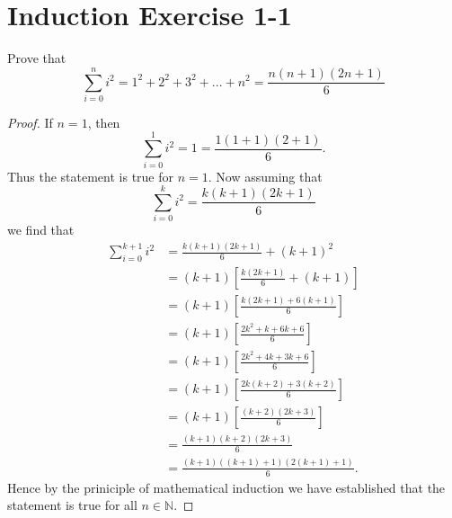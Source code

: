 \documentclass{article}
\begin{document}
\section*{Induction Exercise 1-1}
Prove that
\[
	\sum_{i=0}^{n} i^2 = 1^2 + 2^2 + 3^2 + ... + n^2 = \frac{n(n+1)(2n+1)}{6}
\]
\begin{proof}
	If $n=1$, then
	\[
		\sum_{i=0}^{1} i^2 = 1 = \frac{1(1+1)(2+1)}{6}.
	\]
	Thus the statement is true for $n=1$.
	\newline\newline
	Now assuming that
	\[
		\sum_{i=0}^{k} i^2 = \frac{k(k+1)(2k+1)}{6}
	\]
	we find that 
	\begin{align*}
		\sum_{i=0}^{k+1} i^2 & = \frac{k(k+1)(2k+1)}{6} + (k+1)^2 \\
				     & = (k+1) \left[ \frac{k(2k+1)}{6} + (k+1) \right] \\
				     & = (k+1) \left[ \frac{k(2k+1) + 6(k+1)}{6} \right] \\
				     & = (k+1) \left[ \frac{2k^2 + k + 6k + 6}{6} \right] \\
				     & = (k+1) \left[ \frac{2k^2 + 4k + 3k + 6}{6} \right] \\
				     & = (k+1) \left[ \frac{2k(k+2) + 3(k+2)}{6} \right] \\
				     & = (k+1) \left[ \frac{(k+2)(2k+3)}{6} \right] \\
				     & = \frac{(k+1)(k+2)(2k+3)}{6} \\
				     & = \frac{(k+1)((k+1)+1)(2(k+1)+1)}{6}.
	\end{align*}
	Hence by the priniciple of mathematical induction we have established that the statement is true for all $n \in \mathbb{N}$.
\end{proof}
\end{document}
